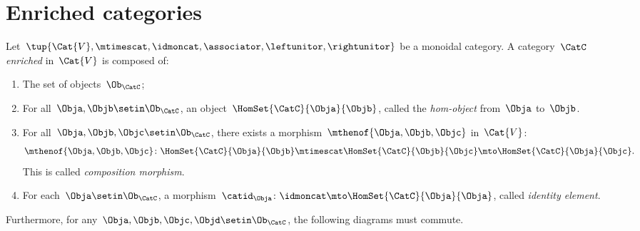 
\section{Enriched categories}
\label{sec:enrichment-enriched-categories}

\begin{ctdefinition}
    \label{def:enriched_cat}
    Let~$\tup{\Cat{V},\mtimescat, \idmoncat, \associator, \leftunitor,\rightunitor}$ be a monoidal category.
    A category~$\CatC$ \emph{enriched} in~$\Cat{V}$ is composed of:
    \begin{enumerate}
        \item The set of objects~$\Ob_\CatC$;
        \item For all~$\Obja,\Objb\setin \Ob_\CatC$, an object~$\HomSet{\CatC}{\Obja}{\Objb}$, called the \emph{hom-object} from~$\Obja$ to~$\Objb$.
        \item For all~$\Obja, \Objb, \Objc\setin \Ob_\CatC$, there exists a morphism~$\mthenof{\Obja,\Objb,\Objc}$ in~$\Cat{V}$:
              \begin{equation}
                  \mthenof{\Obja,\Objb,\Objc}\colon \HomSet{\CatC}{\Obja}{\Objb}\mtimescat \HomSet{\CatC}{\Objb}{\Objc}\mto \HomSet{\CatC}{\Obja}{\Objc}.
              \end{equation}
              This is called \emph{composition morphism}.
        \item For each~$\Obja\setin \Ob_\CatC$, a morphism~$\catid_\Obja\colon \idmoncat \mto \HomSet{\CatC}{\Obja}{\Obja}$, called \emph{identity element}.
    \end{enumerate}
    Furthermore, for any~$\Obja,\Objb,\Objc,\Objd\setin \Ob_\CatC$, the following diagrams must commute.
\end{ctdefinition}

\begin{widepar}
    \begin{center}
    \end{center}

    \begin{center}
    \end{center}
\end{widepar}

